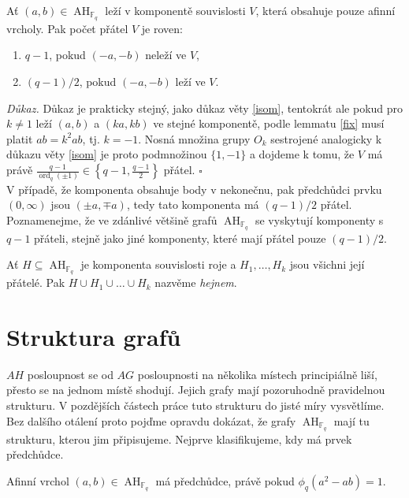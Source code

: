 \documentclass[12pt]{report}
\DeclareMathOperator{\ord}{ord}
\DeclareMathOperator{\AH}{AH}
\begin{document}
\begin{veta}\label{lol}
Ať $(a,b) \in \AH_{\mathbb{F}_q}$ leží v komponentě souvislosti $V$, která obsahuje pouze afinní vrcholy. Pak počet přátel $V$ je roven:
\begin{enumerate}
\item $q-1$, pokud $(-a,-b)$ neleží ve $V$,
\item $(q-1)/2$, pokud $(-a,-b)$ leží ve $V$.
\end{enumerate} 
\end{veta}
\noindent \textit{Důkaz.} Důkaz je prakticky stejný, jako důkaz věty \ref{isom}, tentokrát ale pokud pro $k \neq 1$ leží $(a,b)$ a $(ka,kb)$ ve stejné komponentě, podle lemmatu \ref{fix} musí platit $a b = k^2 ab$, tj. $k = - 1$. Nosná množina grupy $O_{k}$ sestrojené analogicky k důkazu věty \ref{isom} je proto podmnožinou $\lbrace 1,-1 \rbrace$ a dojdeme k tomu, že  $V$ má právě $\frac{q-1}{\ord_q (\pm 1)} \in  \left\lbrace q-1,\frac{q-1}{2}\right\rbrace$ přátel. \hfill $\square$\\

V případě, že komponenta obsahuje body v nekonečnu, pak předchůdci prvku $(0,\infty)$ jsou $(\pm a,\mp a)$, tedy tato komponenta má $(q-1)/2$ přátel. Poznamenejme, že ve zdánlivé většině grafů $\AH_{\mathbb{F}_q}$ se vyskytují komponenty s $q-1$ přáteli, stejně jako jiné komponenty, které mají přátel pouze $(q-1)/2$.

\begin{definice}
Ať $H \subseteq \AH_{\mathbb{F}_q}$ je komponenta souvislosti roje a $H_1,\dots,H_k$ jsou všichni její přátelé. Pak $H \cup H_1 \cup \dots \cup H_k$ nazvěme \textit{hejnem}.
\end{definice}
 

\section{Struktura grafů}

$AH$ posloupnost se od $AG$ posloupnosti na několika místech principiálně liší, přesto se na jednom místě shodují. Jejich grafy mají pozoruhodně pravidelnou strukturu. V pozdějších částech práce tuto strukturu do jisté míry vysvětlíme. Bez dalšího otálení proto pojďme opravdu dokázat, že grafy $\AH_{\mathbb{F}_q}$ mají tu strukturu, kterou jim připisujeme. Nejprve klasifikujeme, kdy má prvek předchůdce.

\begin{lemma}\label{lema}
Afinní vrchol $(a,b) \in \AH_{\mathbb{F}_q}$ má předchůdce, právě pokud $\phi_q(a^2-ab)=1$.
\end{lemma}
\end{document}
